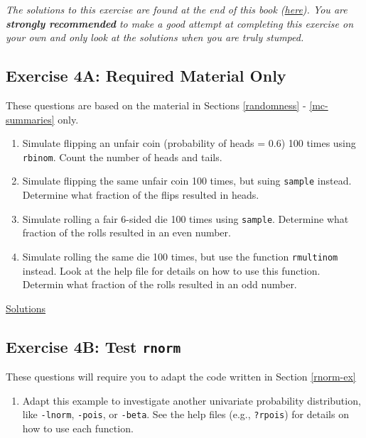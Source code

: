\documentclass[]{book}
\providecommand{\tightlist}{%
  \setlength{\itemsep}{0pt}\setlength{\parskip}{0pt}}
\theoremstyle{definition}
\theoremstyle{definition}
\theoremstyle{definition}
\theoremstyle{remark}
\begin{document}
\emph{The solutions to this exercise are found at the end of this book
(\protect\hyperlink{ex4a-answers}{here}). You are \textbf{strongly
recommended} to make a good attempt at completing this exercise on your
own and only look at the solutions when you are truly stumped.}

\subsection*{Exercise 4A: Required Material
Only}\label{exercise-4a-required-material-only}

These questions are based on the material in Sections \ref{randomness} -
\ref{mc-summaries} only.

\begin{enumerate}
\def\labelenumi{\arabic{enumi}.}
\tightlist
\item
  Simulate flipping an unfair coin (probability of heads = 0.6) 100
  times using \texttt{rbinom}. Count the number of heads and tails.
\item
  Simulate flipping the same unfair coin 100 times, but suing
  \texttt{sample} instead. Determine what fraction of the flips resulted
  in heads.
\item
  Simulate rolling a fair 6-sided die 100 times using \texttt{sample}.
  Determine what fraction of the rolls resulted in an even number.
\item
  Simulate rolling the same die 100 times, but use the function
  \texttt{rmultinom} instead. Look at the help file for details on how
  to use this function. Determin what fraction of the rolls resulted in
  an odd number.
\end{enumerate}

\protect\hyperlink{ex4a-answers}{Solutions}

\subsection*{\texorpdfstring{Exercise 4B: Test
\texttt{rnorm}}{Exercise 4B: Test rnorm}}\label{exercise-4b-test-rnorm}

These questions will require you to adapt the code written in Section
\ref{rnorm-ex}

\begin{enumerate}
\def\labelenumi{\arabic{enumi}.}
\tightlist
\item
  Adapt this example to investigate another univariate probability
  distribution, like \texttt{-lnorm}, \texttt{-pois}, or \texttt{-beta}.
  See the help files (e.g., \texttt{?rpois}) for details on how to use
  each function.
\end{enumerate}
\end{document}
